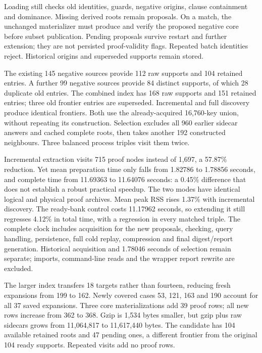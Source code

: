 \documentclass[11pt,a4paper]{article}
\numberwithin{equation}{section}
\theoremstyle{plain}
\theoremstyle{definition}
\theoremstyle{remark}
\begin{document}
Loading still checks old identities, guards, negative origins, clause containment
and dominance. Missing derived roots remain proposals. On a match, the unchanged
materializer must produce and verify the proposed negative core before subset
publication. Pending proposals survive restart and further extension; they are
not persisted proof-validity flags. Repeated batch identities reject. Historical
origins and superseded supports remain stored.

The existing 145 negative sources provide 112 raw supports and 104 retained
entries. A further 99 negative sources provide 84 distinct supports, of which
28 duplicate old entries. The combined index has 168 raw supports and 151
retained entries; three old frontier entries are superseded. Incremental and
full discovery produce identical frontiers. Both use the already-acquired
16,760-key union, without repeating its construction. Selection excludes all
960 earlier sidecar answers and cached complete roots, then takes another 192
constructed neighbours. Three balanced process triples visit them twice.

Incremental extraction visits 715 proof nodes instead of 1,697, a 57.87\%
reduction. Yet mean preparation time only falls from 1.82786 to 1.78856 seconds,
and complete time from 11.69363 to 11.64076 seconds: a 0.45\% difference that
does not establish a robust practical speedup. The two modes have identical
logical and physical proof archives. Mean peak RSS rises 1.37\% with incremental
discovery. The ready-bank control costs 11.17962 seconds, so extending it still
regresses 4.12\% in total time, with a regression in every matched triple.
The complete clock includes acquisition for the new proposals, checking, query
handling, persistence, full cold replay, compression and final digest/report
generation. Historical acquisition and 1.78046 seconds of selection remain
separate; imports, command-line reads and the wrapper report rewrite are excluded.

The larger index transfers 18 targets rather than fourteen, reducing fresh
expansions from 199 to 162. Newly covered cases 53, 121, 163 and 190 account
for all 37 saved expansions. Three core materializations add 39 proof rows;
all new rows increase from 362 to 368. Gzip is 1,534 bytes smaller, but gzip
plus raw sidecars grows from 11,064,817 to 11,617,440 bytes. The candidate has
104 available retained roots and 47 pending ones, a different frontier from
the original 104 ready supports. Repeated visits add no proof rows.
\end{document}
